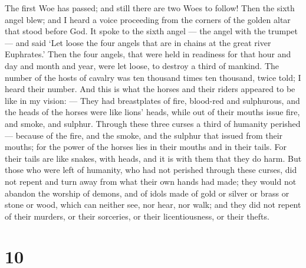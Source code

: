  The first Woe has passed; and still there are two Woes to
follow!  Then the sixth angel blew; and I heard a voice
proceeding from the corners of the golden altar that stood before God.
 It spoke to the sixth angel --- the angel with the trumpet
--- and said `Let loose the four angels that are in chains at the great
river Euphrates.'  Then the four angels, that were held in
readiness for that hour and day and month and year, were let loose, to
destroy a third of mankind.  The number of the hosts of
cavalry was ten thousand times ten thousand, twice told; I heard their
number.  And this is what the horses and their riders
appeared to be like in my vision: --- They had breastplates of fire,
blood-red and sulphurous, and the heads of the horses were like lions'
heads, while out of their mouths issue fire, and smoke, and sulphur.
 Through these three curses a third of humanity perished
--- because of the fire, and the smoke, and the sulphur that issued from
their mouths;  for the power of the horses lies in their
mouths and in their tails. For their tails are like snakes, with heads,
and it is with them that they do harm.  But those who were
left of humanity, who had not perished through these curses, did not
repent and turn away from what their own hands had made; they would not
abandon the worship of demons, and of idols made of gold or silver or
brass or stone or wood, which can neither see, nor hear, nor walk;
 and they did not repent of their murders, or their
sorceries, or their licentiousness, or their thefts.

\hypertarget{section-9}{%
\section{10}\label{section-9}}

